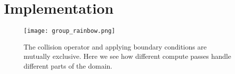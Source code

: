 \section{Implementation}

\begin{figure}
  \begin{center}
    \texttt{[image: group\_rainbow.png]}
  \end{center}
  \caption{The collision operator and applying boundary conditions are mutually exclusive.
  Here we see how different compute passes handle different parts of the domain.}
\end{figure}
